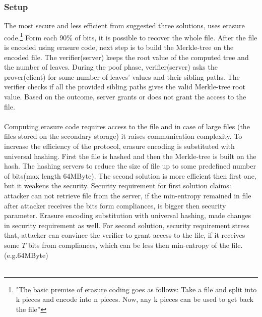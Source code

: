 \documentclass[12pt]{article}
\begin{document}
\subsubsection{Setup}
\label{subsub:setup1}
The most secure and less efficient  from suggested three solutions, uses erasure code.\footnote{"The basic premise of erasure coding goes as follows: Take a file and split into k pieces and
encode into n pieces. Now, any k pieces can be used to get back the file”} Form each 90\% of bits, it is possible to recover the whole file. After the file is encoded using erasure code, next step is to build the Merkle-tree\cite{Merkle} on the encoded file. The verifier(server) keeps the root value of the computed tree and the number of leaves. During the poof phase, verifier(server) asks the  prover(client)  for some number of leaves' values and their sibling paths. The verifier checks if all the provided sibling paths gives the valid Merkle-tree root value. Based on the outcome, server grants or does not grant the access to the file.\\\\
Computing erasure code requires access to the file and in case of large files (the files stored on the secondary storage) it raises communication complexity. To increase the efficiency of the protocol, erasure encoding is substituted with universal hashing\cite{Hash}. First the file is hashed and then the Merkle-tree is built on the hash. The hashing servers to reduce the size of file up to some predefined number of bits(max length 64MByte). The second solution is more efficient then first one, but it  weakens the security. Security requirement for first solution claims: attacker can not retrieve file from the server, if the min-entropy remained in file after attacker receives the bits form compliances, is bigger then security parameter. Erasure encoding  substitution with universal hashing, made changes in security requirement as well. For second solution, security requirement stress that, attacker can convince the verifier to grant access to the file, if it receives some $T$ bits from compliances, which can be less then min-entropy of the file. (e.g.64MByte)\\\\
\end{document}
